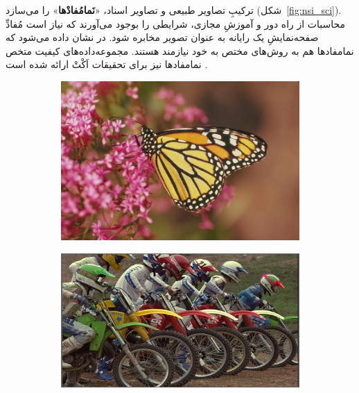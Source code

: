 \documentclass[twocolumn]{article}
\begin{document}
ترکیبِ تصاویر طبیعی و تصاویر اسناد، «\textbf{نَمامُفادْها}» را می‌سازد (شکل~\ref{fig:nsi_sci}). محاسبات از راه دور و آموزشِ مجازی، شرایطی را بوجود می‌آورند که نیاز است مُفادِّ صفحه‌نمایشِ یک رایانه به عنوان تصویر مخابره شود. در \cite{yang2015perceptual} نشان داده می‌شود که نمامفادها هم به روش‌های مختص به خود نیازمند هستند. مجموعه‌داده‌های کیفیت متخص نمامفادها نیز برای تحقیقات اَکْتْ ارائه شده است \cite{yang2015perceptual, ni2017}.
\begin{figure}
	\begin{subfigure}{0.24\textwidth}
		\includegraphics[width=\textwidth]{monarch.jpg}
		\caption{}
		\label{fig:nsi_1}
	\end{subfigure}
	\hfill
	\begin{subfigure}{0.24\textwidth}
		\includegraphics[width=\textwidth]{bikes.jpg}
		\caption{}
		\label{fig:nsi_2}
	\end{subfigure}

\end{figure}
\end{document}
